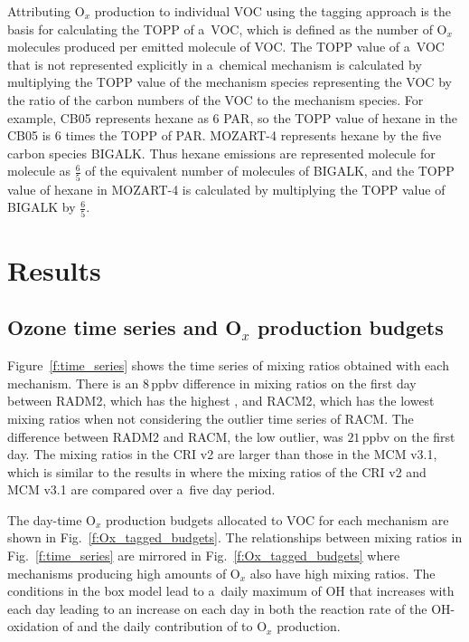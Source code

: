 \documentclass[acpd, online, hvmath]{copernicus}
\begin{document}
Attributing O$_{x}$ production to individual VOC using the tagging
approach is the basis for calculating the TOPP of a~VOC, which is
defined as the number of O$_{x}$ molecules produced per emitted
molecule of VOC.  The TOPP value of a~VOC that is not represented
explicitly in a~chemical mechanism is calculated by multiplying the
TOPP value of the mechanism species representing the VOC by the ratio
of the carbon numbers of the VOC to the mechanism species.  For
example, CB05 represents hexane as $6$ PAR, so the TOPP value of
hexane in the CB05 is $6$ times the TOPP of PAR.  MOZART-4 represents
hexane by the five carbon species BIGALK.  Thus hexane emissions are
represented molecule for molecule as $\frac{6}{5}$ of the equivalent
number of molecules of BIGALK, and the TOPP value of hexane in
MOZART-4 is calculated by multiplying the TOPP value of BIGALK by
$\frac{6}{5}$.



\section{Results}
\label{s:results}


\subsection{Ozone time series and O$_{x}$ production budgets}
\label{ss:O3_time_series}

Figure~\ref{f:time_series} shows the time series of  mixing
ratios obtained with each mechanism.  There is an $8$\,\unit{ppbv}
difference in  mixing ratios on the first day between RADM2,
which has the highest , and RACM2, which has the lowest
 mixing ratios when not considering the outlier time series
of RACM.  The difference between RADM2 and RACM, the low outlier, was
$21$\,\unit{ppbv} on the first day.  The  mixing ratios in
the CRI v2 are larger than those in the MCM v3.1, which is similar to
the results in \citet{Jenkin:2008} where the  mixing ratios
of the CRI v2 and MCM v3.1 are compared over a~five day period.

The day-time O$_{x}$ production budgets allocated to VOC for each
mechanism are shown in Fig.~\ref{f:Ox_tagged_budgets}.  The
relationships between  mixing ratios in
Fig.~\ref{f:time_series} are mirrored in
Fig.~\ref{f:Ox_tagged_budgets} where mechanisms producing high amounts
of O$_{x}$ also have high  mixing ratios.  The conditions
in the box model lead to a~daily maximum of OH that increases with
each day leading to an increase on each day in both the reaction rate
of the OH-oxidation of  and the daily contribution of
 to O$_{x}$ production.
\end{document}
